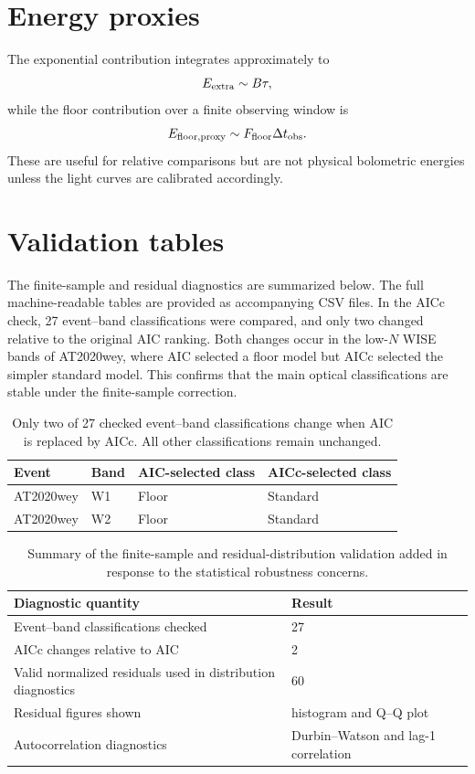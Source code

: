 \documentclass[11pt]{article}
\begin{document}
\section{Energy proxies}
The exponential contribution integrates approximately to
\begin{equation}
E_{\rm extra}\sim B\tau,
\end{equation}
while the floor contribution over a finite observing window is
\begin{equation}
E_{\rm floor,proxy}\sim F_{\rm floor}\Delta t_{\rm obs}.
\end{equation}
These are useful for relative comparisons but are not physical bolometric energies unless the light curves are calibrated accordingly.

\section{Validation tables}
The finite-sample and residual diagnostics are summarized below. The full machine-readable tables are provided as accompanying CSV files. In the AICc check, 27 event--band classifications were compared, and only two changed relative to the original AIC ranking. Both changes occur in the low-$N$ WISE bands of AT2020wey, where AIC selected a floor model but AICc selected the simpler standard model. This confirms that the main optical classifications are stable under the finite-sample correction.

\begin{table}[H]
\centering
\begin{tabular}{llll}
\toprule
Event & Band & AIC-selected class & AICc-selected class \\
\midrule
AT2020wey & W1 & Floor & Standard \\
AT2020wey & W2 & Floor & Standard \\
\bottomrule
\end{tabular}
\caption{Only two of 27 checked event--band classifications change when AIC is replaced by AICc. All other classifications remain unchanged.}
\label{tab:aicc_changes_compact}
\end{table}

\begin{table}[H]
\centering
\begin{tabular}{ll}
\toprule
Diagnostic quantity & Result \\
\midrule
Event--band classifications checked & 27 \\
AICc changes relative to AIC & 2 \\
Valid normalized residuals used in distribution diagnostics & 60 \\
Residual figures shown & histogram and Q--Q plot \\
Autocorrelation diagnostics & Durbin--Watson and lag-1 correlation \\
\bottomrule
\end{tabular}
\caption{Summary of the finite-sample and residual-distribution validation added in response to the statistical robustness concerns.}
\label{tab:minimal_stats_summary}
\end{table}
\end{document}
